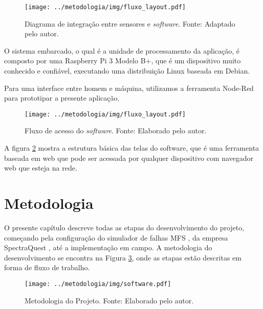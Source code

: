 \documentclass[a4paper]{ifacconf}
\begin{document}
\begin{figure}[H]
  \begin{center}
      \texttt{[image: ../metodologia/img/fluxo\_layout.pdf]}
  \end{center}
  \caption{Diagrama de integração  entre sensores e \textit{software}. Fonte: Adaptado pelo autor.}
  \label{fig:fluxo_integracao}
\end{figure}

O sistema embarcado, o qual é a unidade de processamento da aplicação, é composto por uma Raspberry Pi 3 Modelo B+, que é um dispositivo muito 
conhecido e confiável, executando uma distribuição Linux baseada em Debian.

Para uma interface entre homem e máquina, utilizamos a ferramenta 
Node-Red para prototipar a presente aplicação.

\begin{figure}[H]
  \begin{center}
      \texttt{[image: ../metodologia/img/fluxo\_layout.pdf]}
  \end{center}
  \caption{Fluxo de acesso do \textit{software}. Fonte: Elaborado pelo autor.} 
  \label{fig:fluxo_software}
\end{figure}

A figura \ref{fig:fluxo_software} mostra a estrutura básica das telas do software, que é uma ferramenta 
baseada em web que pode ser acessada por qualquer dispositivo com navegador web que esteja na rede.



\section{Metodologia}

O presente capítulo descreve todas as etapas do desenvolvimento do projeto, começando pela configuração do simulador de falhas MFS 
\textsuperscript \textregistered, da empresa SpectraQuest \textsuperscript \textregistered, até a implementação em campo. A metodologia do
desenvolvimento se encontra na Figura \ref{fig:metodologia}, onde as etapas estão descritas em forma de fluxo de trabalho.

\begin{figure}[H]
  \begin{center}
      \texttt{[image: ../metodologia/img/software.pdf]}
      \caption{Metodologia do Projeto. Fonte: Elaborado pelo autor.}
  \end{center} 
  \label{fig:metodologia}
\end{figure}
\end{document}
